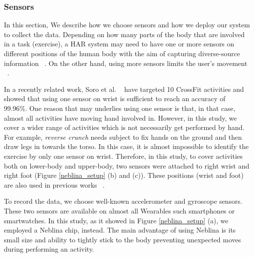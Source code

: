 \documentclass[journal,article,submit,moreauthors,pdftex]{Definitions/mdpi}
\begin{document}
\subsubsection{Sensors}

In this section, We describe how we choose sensors and how we deploy our system to collect the data. Depending on how many parts of the body that are involved in a task (exercise), a HAR system may need to have one or more sensors on different positions of the human body with the aim of capturing diverse-source information ~\cite{wang2019survey}. On the other hand, using more sensors limits the user's movement ~\cite{de2018comparative}. 

In a recently related work, Soro et al. ~\cite{soro2019recognition} have targeted 10 CrossFit activities and showed that using one sensor on wrist is sufficient to reach an accuracy of 99.96\%. One reason that may underlies using one sensor is that, in that case, almost all activities have moving hand involved in. However, in this study, we cover a wider range of activities which is not necessarily get performed by hand. For example, \textit{reverse crunch} needs subject to fix hands on the ground and then draw legs in towards the torso. In this case, it is almost impossible to identify the exercise by only one sensor on wrist. Therefore, in this study, to cover activities both on lower-body and upper-body, two sensors were attached to right wrist and right foot (Figure \ref{neblina_setup} (b) and (c)). These positions (wrist and foot) are also used in previous works ~\cite{baldominos2019comparison, anwary2018automatic, soro2019recognition}.

To record the data, we choose well-known accelerometer and gyroscope sensors. These two sensors are  available on almost all Wearables such smartphones or smartwatches. In this study, as it showed in Figure \ref{neblina_setup} (a), we employed a Neblina chip, instead. The main advantage of using Neblina is its small size and ability to tightly stick to the body preventing unexpected moves during performing an activity.
\end{document}
